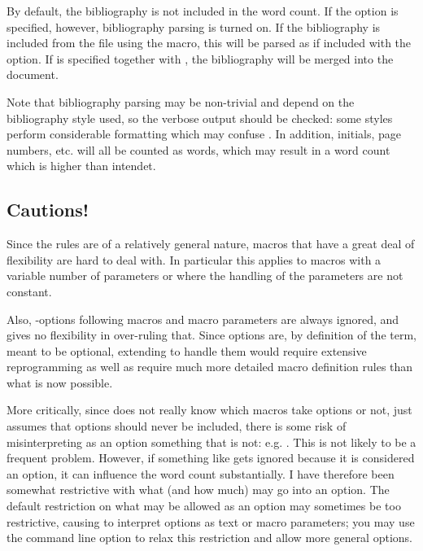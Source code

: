 \documentclass{article}
\begin{document}
By default, the bibliography is not included in the word count. If the  option is specified, however, bibliography parsing is turned on. If the bibliography is included from the  file using the  macro, this will be parsed as if included with the  option. If  is specified together with , the bibliography will be merged into the document.

Note that bibliography parsing may be non-trivial and depend on the bibliography style used, so the verbose output should be checked: some styles perform considerable formatting which may confuse \TeXcount{}. In addition, initials, page numbers, etc. will all be counted as words, which may result in a word count which is higher than intendet.

\subsection{Cautions!}

Since the rules are of a relatively general nature, macros that have a great deal of flexibility are hard to deal with. In particular this applies to macros with a variable number of parameters or where the handling of the parameters are not constant.

Also, \code{[]}-options following macros and macro parameters are always ignored, and \TeXcount{} gives no flexibility in over-ruling that. Since options are, by definition of the term, meant to be optional, extending \TeXcount{} to handle them would require extensive reprogramming as well as require much more detailed macro definition rules than what is now possible.

More critically, since \TeXcount{} does not really know which macros take options or not, just assumes that options should never be included, there is some risk of misinterpreting as an option something that is not: e.g. . This is not likely to be a frequent problem. However, if something like  gets ignored because it is considered an option, it can influence the word count substantially. I have therefore been somewhat restrictive with what (and how much) may go into an option. The default restriction on what may be allowed as an option may sometimes be too restrictive, causing \TeXcount{} to interpret options as text or macro parameters; you may use the command line option  to relax this restriction and allow more general options.
\end{document}
